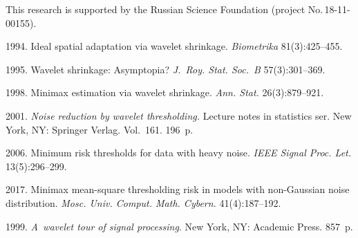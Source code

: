 





 \Ack
\noindent
This research is supported by the Russian Science Foundation (project No.\,18-11-00155).




  \begin{multicols}{2}

\renewcommand{\bibname}{\protect\rmfamily References}

{\small\frenchspacing
 {%
 \begin{thebibliography}{9}

 1994. 
Ideal spatial adaptation via wavelet shrinkage. \textit{Biometrika} 81(3):425--455.

 1995. 
Wavelet shrinkage: Asymptopia? \textit{J.~Roy. Stat. Soc.~B} 57(3):301--369.

 1998. 
Minimax estimation via wavelet shrinkage. \textit{Ann. Stat.}  26(3):879--921.

 2001. \textit{Noise reduction by wavelet thresholding.}
 Lecture notes in statistics ser. New York, NY: Springer Verlag.  Vol.~161. 196~p.

 2006. Minimum risk thresholds for data with heavy noise. 
\textit{IEEE Signal Proc. Let.} 13(5):296--299.

 2017. 
Minimax mean-square thresholding risk in models with non-Gaussian noise distribution. 
\textit{Mosc. Univ. Comput. Math. Cybern.} 41(4):187--192.

 1999. 
\textit{A~wavelet tour of signal processing}. New York, NY: Academic Press. 857~p.

\end{thebibliography}

 }
 }

\end{multicols}

